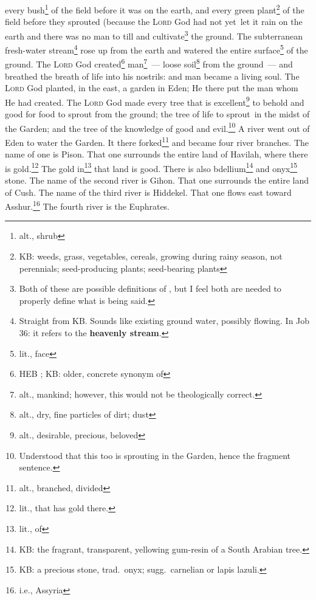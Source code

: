 \begin{inparaenum}
     every bush\footnote{alt., shrub} of the field before it was on the earth, and every green plant\footnote{KB: weeds, grass, vegetables, cereals, growing during rainy season, not perennials; seed-producing plants; seed-bearing plants} of the field before they sprouted (because the \textsc{Lord} God had not yet\understood\ let it rain on the earth and there was no man to till and cultivate\footnote{Both of these are possible definitions of , but I feel both are needed to properly define what is being said.} the ground.%
     The subterranean fresh-water stream\footnote{Straight from KB. Sounds like existing ground water, possibly flowing. In Job 36\thinspace: it refers to the \textbf{heavenly stream}.} rose up from the earth and watered the entire surface\footnote{lit., face} of the ground.%
     The \textsc{Lord} God created\footnote{HEB ; KB: older, concrete synonym of } man\footnote{alt., mankind; however, this would not be theologically correct.}~--- loose soil\footnote{alt., dry, fine particles of dirt; dust} from the ground~--- and breathed the breath of life into his nostrils: and man became a living soul.%
     The \textsc{Lord} God planted, in the east, a garden in Eden; He there put the man whom He had created.%
     The \textsc{Lord} God made every tree that is excellent\footnote{alt., desirable, precious, beloved} to behold and good for food to sprout from the ground; the tree of life to sprout\understood\ in the midst of the Garden; and the tree of the knowledge of good and evil.\footnote{Understood that this too is sprouting in the Garden, hence the fragment sentence.}%
     A river went out of Eden to water the Garden. It there forked\footnote{alt., branched, divided} and became four river branches.%
     The name of one is Pison. That one surrounds the entire land of Havilah, where there is gold.\footnote{lit., that has gold there.}%
     The gold in\footnote{lit., of} that land is good. There is also bdellium\footnote{KB: the fragrant, transparent, yellowing gum-resin of a South Arabian tree.} and onyx\footnote{KB: a precious stone, trad.\ onyx; sugg.\ carnelian or lapis lazuli.} stone.%
     The name of the second river is Gihon. That one surrounds the entire land of Cush.%
     The name of the third river is Hiddekel. That one flows east toward Asshur.\footnote{i.e., Assyria} The fourth river is the Euphrates.%

\end{inparaenum}
